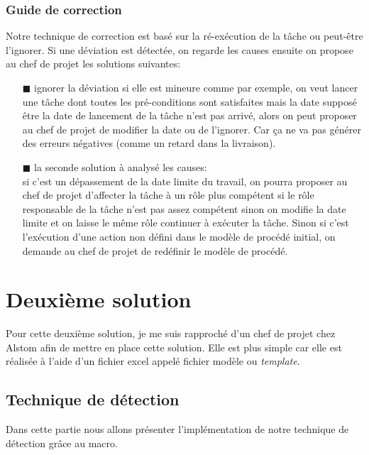 \subsubsection*{Guide de correction}
Notre technique de correction est basé sur la ré-exécution de la tâche ou peut-être l'ignorer. Si une déviation est détectée, on regarde les causes ensuite on propose au chef de projet les solutions suivantes:\\
\begin{itemize}
\item[\tiny{$\blacksquare$}] ignorer la déviation si elle est mineure comme par exemple, on veut lancer une tâche dont toutes les pré-conditions sont satisfaites mais la date supposé être la date de lancement de la tâche n'est pas arrivé, alors on peut proposer au chef de projet de modifier la date ou de l'ignorer. Car ça ne va pas générer des erreurs négatives (comme un retard dans la livraison).
\item[\tiny{$\blacksquare$}] la seconde solution à analysé les causes:\\
si c'est un dépassement de la date limite du travail, on pourra proposer au chef de projet d'affecter la tâche à un rôle plus compétent si le rôle responsable de la tâche n'est pas assez compétent sinon on modifie la date limite et on laisse le même rôle continuer à exécuter la tâche. Sinon si c'est l'exécution d'une action non défini dans le modèle de procédé initial, on demande au chef de projet de redéfinir le modèle de procédé.
\end{itemize}
\section{Deuxième solution}
Pour cette deuxième solution, je me suis rapproché d'un chef de projet chez \og Alstom \fg{} afin de mettre en place cette solution. Elle est plus simple car elle est réalisée à l'aide d'un fichier excel appelé \og fichier modèle \fg{} ou \textit{template}.
\clearpage 
\subsection{Technique de détection}
Dans cette partie nous allons présenter l'implémentation de notre technique de détection grâce au macro.

